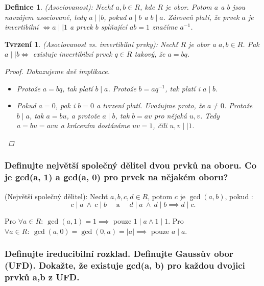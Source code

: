 \documentclass[10pt,a4paper]{article}
\newtheorem{definice}{Definice}
\newtheorem{tvrzeni}{Tvrzení}
\begin{document}
\begin{definice} (Asociovanost): \normalfont
    Nechť $a,b \in R$, kde $R$ je obor. Potom $a$ a $b$ jsou navzájem \textit{asociované}, tedy $a\mid\mid b$, pokud $a\mid b$ a $b \mid a$.
    Zároveň platí, že prvek $a$ je invertibilní $\iff a \mid\mid 1$ a prvek $b$ splňující $ab = 1$ značíme $a^{-1}$.
\end{definice}

\begin{tvrzeni}(Asociovanost vs. invertibilní prvky): \normalfont
    Nechť $R$ je obor a $a, b \in R$. Pak $a \mid\mid b \iff$ existuje invertibilní prvek $q \in R$ takový, že $a = bq$.
\begin{proof} Dokazujeme dvě implikace.
    \begin{itemize}
        \item [$\Longleftarrow$] Protože $a = bq$, tak platí $b \mid a$. Protože $b = aq^{-1}$, tak platí i $a \mid b$.
        \item [$\implies$] Pokud $a = 0$, pak i $b = 0$ a tvrzení platí.
        Uvažujme proto, že $a \neq 0$. Protože $b \mid a$, tak $a = bu$, a protože $a \mid b$, tak $b = av$ pro nějaká $u, v$. 
        Tedy $a = bu = avu$ a krácením dostáváme $uv = 1$, čili $u, v \mid\mid 1$.
    \end{itemize} 
\end{proof}
\end{tvrzeni}

\subsubsection{Definujte největší společný dělitel dvou prvků na oboru. Co je gcd(a, 1) a gcd(a, 0) pro prvek na nějakém oboru?}

 (Největší společný dělitel): \normalfont Nechť $a,b,c,d \in R$, potom $c \text{ je } \gcd(a,b)$, pokud :
\[
    c\mid a ~\land~ c \mid b \quad \text{ a } \quad d\mid a ~\land~ d\mid b \implies d \mid c.
\]

Pro $\forall a \in R: ~\gcd(a,1) = 1 \implies $ pouze $1 \mid a \land 1 \mid 1$.
Pro $\forall a \in R: ~\gcd(a,0) = \gcd(0, a) = |a| \implies$ pouze $a \mid a$.

\subsubsection{Definujte ireducibilní rozklad. Definujte Gaussův obor (UFD). Dokažte, že existuje gcd(a, b) pro každou dvojici prvků a,b z UFD.}
\end{document}
